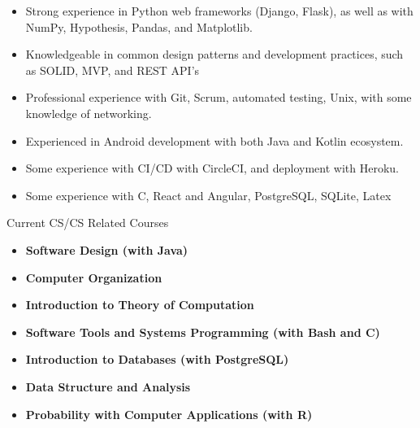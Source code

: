 \begin{itemize}
\item Strong experience in Python web frameworks (Django, Flask), as well as with NumPy, Hypothesis, Pandas, and Matplotlib.
\item Knowledgeable in common design patterns and development practices, such as SOLID, MVP, and REST API’s
\item Professional experience with Git, Scrum, automated testing, Unix, with some knowledge of networking.
\item Experienced in Android development with both Java and Kotlin ecosystem.
\item Some experience with CI/CD with CircleCI, and deployment with Heroku.
\item Some experience with C, React and Angular, PostgreSQL, SQLite, Latex
\end{itemize}





Current CS/CS Related Courses \\[4pt]
\begin{itemize}
\item \textbf{Software Design (with Java)}
\item \textbf{Computer Organization}
\item \textbf{Introduction to Theory of Computation}
\item \textbf{Software Tools and Systems Programming (with Bash and C)}
\item \textbf{Introduction to Databases (with PostgreSQL)}
\item \textbf{Data Structure and Analysis}
\item \textbf{Probability with Computer Applications (with R)}
\end{itemize}



\divider


\divider

